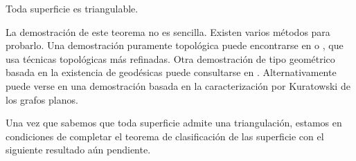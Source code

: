 \documentclass[GTS.tex]{subfiles}
\begin{document}
\begin{teorema}
Toda superficie es triangulable.
\end{teorema}

La demostración de este teorema no es sencilla. Existen varios métodos para probarlo. Una demostración puramente topológica puede encontrarse en \cite{Moise} o \cite{Doyle}, que usa técnicas topológicas más refinadas. Otra demostración de tipo geométrico basada en la existencia de geodésicas puede consultarse en \cite{Bloch}. Alternativamente puede verse en \cite{Mohar} una demostración basada en la caracterización por Kuratowski de los grafos planos.

Una vez que sabemos que toda superficie admite una triangulación, estamos en condiciones de completar el teorema de clasificación de las superficie con el siguiente resultado aún pendiente.
\end{document}

